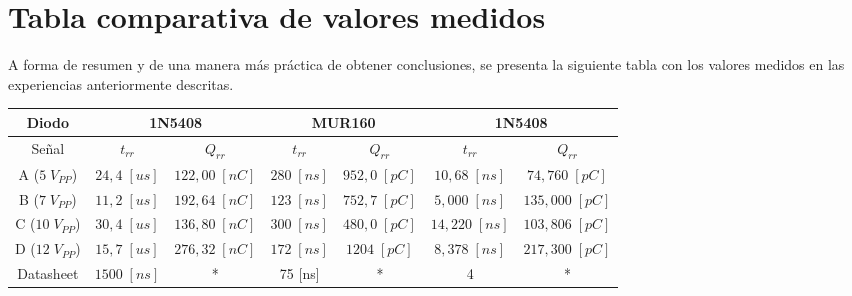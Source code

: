 \documentclass{article}
\begin{document}
\section{Tabla comparativa de valores medidos}
A forma de resumen y de una manera más práctica de obtener conclusiones, se presenta la siguiente tabla con los valores medidos en las experiencias anteriormente descritas. 
\begin{center}
\begin{tabular}{ | c | c | c | c | c | c | c |}
  \hline
  	Diodo	&	 \multicolumn{2}{|c|}{1N5408}	&	\multicolumn{2}{|c|}{MUR160}	& \multicolumn{2}{|c|}{1N5408}	\\
  \hline
  Señal		& $t_{rr}$ & $Q_{rr}$ & $t_{rr}$ & $Q_{rr}$ 	& $t_{rr}$ & $Q_{rr}$ \\
  \hline
    A ($5 \; V_{PP}$)	& $24,4 \; [us]$ & $122,00 \; [nC]$	& $280 \; [ns]$ & $952,0 \; [pC]$ & $10,68 \; [ns]$ & $74,760  \; [pC]$ \\
  \hline
    B ($7 \; V_{PP}$)	& $11,2 \; [us]$ & $192,64 \; [nC]$	& $123 \; [ns]$ & $752,7 \; [pC]$ & $5,000 \; [ns]$ & $135,000  \; [pC]$ \\
  \hline
    C ($10 \; V_{PP}$)	& $30,4 \; [us]$ & $136,80 \; [nC]$ & $300 \; [ns]$ & $480,0 \; [pC]$& $14,220 \; [ns]$ & $103,806  \; [pC]$ \\
  \hline
    D ($12 \; V_{PP}$)	& $15,7 \; [us]$ & $276,32 \; [nC]$ & $172 \; [ns]$ & $1204  \; [pC]$ & $8,378 \; [ns]$ & $217,300  \; [pC]$ \\
  \hline
    Datasheet		& $1500 \; [ns]$ & * & 75 [ns] & * & 4 \; [ns] & * \\
  \hline
  
\end{tabular}
\end{center}

\clearpage
\end{document}
